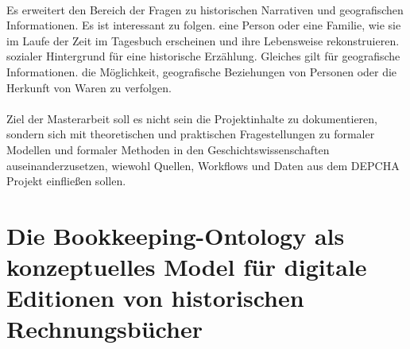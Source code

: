 \documentclass[12pt,a4paper]{article}
\begin{document}
\\
Es erweitert den Bereich der Fragen zu historischen Narrativen und geografischen Informationen. Es ist interessant zu folgen.
eine Person oder eine Familie, wie sie im Laufe der Zeit im Tagesbuch erscheinen und ihre Lebensweise rekonstruieren. 
sozialer Hintergrund für eine historische Erzählung. Gleiches gilt für geografische Informationen.
die Möglichkeit, geografische Beziehungen von Personen oder die Herkunft von Waren zu verfolgen.
\\
\\
Ziel der Masterarbeit soll es nicht sein die Projektinhalte zu dokumentieren, sondern sich mit theoretischen und praktischen Fragestellungen zu formaler Modellen und formaler Methoden in den Geschichtswissenschaften  auseinanderzusetzen, wiewohl Quellen, Workflows und Daten aus dem DEPCHA Projekt einfließen sollen.

\section{Die Bookkeeping-Ontology als konzeptuelles Model für digitale Editionen von historischen Rechnungsbücher}
\label{subsec:DigEdHiRe}
\end{document}
